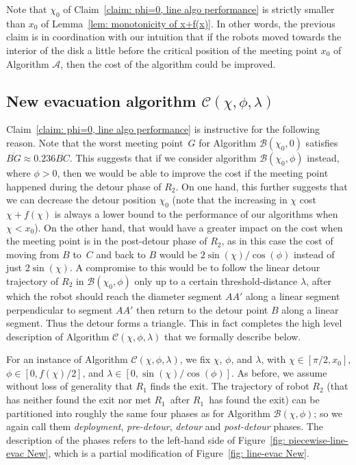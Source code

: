 \documentclass[
final
]{dmtcs-episciences}
\newcommand{\barr}[1]{\overline{#1}}
\newcommand{\sinn}[1]{\sin \left({#1}\right)}
\newcommand{\coss}[1]{\cos \left({#1}\right)}
\newcommand{\RA}{\ensuremath{R_1}}
\newcommand{\RB}{\ensuremath{R_2 }}
\theoremstyle{definition}
\begin{document}
Note that $\chi_0$ of Claim~\ref{claim: phi=0, line algo performance} is strictly smaller than $x_0$ of Lemma~\ref{lem: monotonicity of x+f(x)}. In other words, the previous claim is in coordination with our intuition that if the robots moved towards the interior of the disk a little before the critical position of the meeting point $x_0$ of Algorithm $\mathcal A$, then the cost of the algorithm could be improved. 

\subsection{New evacuation algorithm \texorpdfstring{$\mathcal C(\chi, \phi, \lambda)$}{Lg}}






Claim~\ref{claim: phi=0, line algo performance} is instructive for the following reason. 
Note that the worst meeting point~$G$ for Algorithm $\mathcal B(\chi_0,0)$ satisfies $\barr{BG} \approx 0.236 \barr {BC}$. This suggests that if we consider algorithm $\mathcal B(\chi_0,\phi)$ instead, where $\phi>0$, then we would be able to improve the cost if the meeting point happened during the detour phase of $\RB$. On one hand, this further suggests that we can decrease the detour position $\chi_0$ (note that the increasing in $\chi$ cost $\chi + f(\chi)$ is always a lower bound to the performance of our algorithms when $\chi<x_0$). On the other hand, that would have a greater impact on the cost when the meeting point is in the post-detour phase of $\RB$, as in this case the cost of moving from $B$ to~$C$ and back to $B$ would be $2\sinn{\chi}/\coss{\phi}$ instead of just  $2\sinn{\chi}$. 
A compromise to this would be to follow the linear detour trajectory of $\RB$ in $\mathcal B(\chi_0,\phi)$ only up to a certain threshold-distance $\lambda$, after which the robot should reach the diameter segment
$AA'$ along a linear segment perpendicular to  segment $AA'$
then return to the detour point $B$ along a linear segment.
Thus the detour forms a triangle.
This in fact completes the high level description of Algorithm
$\mathcal C(\chi, \phi, \lambda)$ that we formally describe below. 

For an instance of Algorithm $\mathcal C(\chi, \phi, \lambda)$,
we fix $\chi$, $\phi$, and $\lambda$, with $\chi \in [\pi/2,x_0]$, $\phi \in [0, f(\chi)/2 ]$, and $\lambda \in [0, \sinn{\chi}/\coss{\phi}]$.
As before, we assume without loss of generality that $\RA$ finds the exit. 
The trajectory of robot $\RB$ (that has neither found the exit nor met \RA\ after \RA\ has found the exit) can be partitioned into roughly the same four phases as for Algorithm $\mathcal B(\chi, \phi)$; so we again call them \textit{deployment}, \textit{pre-detour}, \textit{detour} and \textit{post-detour} phases. The description of the phases refers to the left-hand side of Figure~\ref{fig: piecewise-line-evac New}, which is a partial modification of Figure~\ref{fig: line-evac New}.\\
\end{document}
